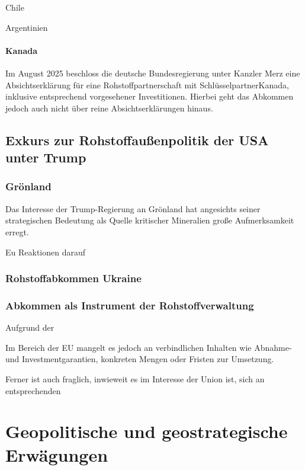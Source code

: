 \documentclass[12pt,a4paper,oneside]{book} %
\begin{document}
Chile

Argentinien

\paragraph{Kanada}

Im August 2025 beschloss die deutsche Bundesregierung unter Kanzler Merz eine Absichtserklärung für eine Rohstoffpartnerschaft mit \glqq Schlüsselpartner\grqq Kanada, inklusive entsprechend vorgesehener Investitionen.\autocites{Stratmann, Handelsblatt, Deutschland plant Rohstoff-Deal mit Kanada}{Joint Declaration of Intent between Canada and Germany on Critical Minerals Cooperation} Hierbei geht das Abkommen jedoch auch nicht über reine Absichtserklärungen hinaus.

\subsection{Exkurs zur Rohstoffaußenpolitik der USA unter Trump}

\subsubsection{Grönland}

Das Interesse der Trump-Regierung an Grönland hat angesichts seiner strategischen Bedeutung als Quelle kritischer Mineralien große Aufmerksamkeit erregt.

Eu Reaktionen darauf

\subsubsection{Rohstoffabkommen Ukraine}


\subsubsection{Abkommen als Instrument der Rohstoffverwaltung}


Aufgrund der 

Im Bereich der EU mangelt es jedoch an verbindlichen Inhalten wie Abnahme- und Investmentgarantien, konkreten Mengen oder Fristen zur Umsetzung.

Ferner ist auch fraglich, inwieweit es im Interesse der Union ist, sich an entsprechenden



\section{Geopolitische und geostrategische Erwägungen}
\end{document}
